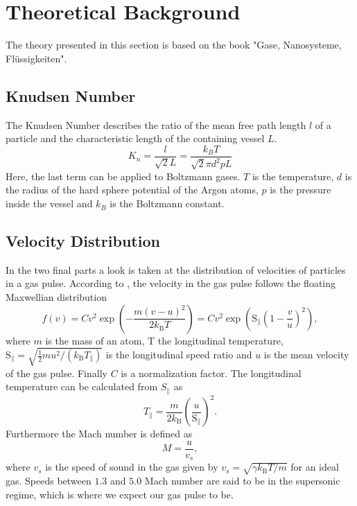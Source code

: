 \documentclass[a4paper,10pt]{article}
\begin{document}
\section{Theoretical Background}
The theory presented in this section is based on the book "Gase, Nanosysteme, Flüssigkeiten".\cite{bergmann}

\subsection{Knudsen Number}
The Knudsen Number describes the ratio of the mean free path length $l$ of a particle and the characteristic length of the containing vessel $L$.
\begin{equation}
  K_n = \frac{l}{\sqrt{2} L} = \frac{k_B T }{\sqrt{2} \pi d^2 p L}
\end{equation}
Here, the last term can be applied to Boltzmann gases. $T$ is the temperature, $d$ is the radius of the hard sphere potential of the Argon atoms, $p$ is the pressure inside the vessel and $k_B$ is the Boltzmann constant.

\subsection{Velocity Distribution}\label{theory}
In the two final parts a look is taken at the distribution of velocities of particles in a gas pulse. According to \cite{bergmann}, the velocity in the gas pulse follows the floating Maxwellian distribution 
\begin{equation}\label{floatmaxwell}
	f(v) = C v^2 \exp(- \frac{m (v - u)^2}{2 k_\mathrm{B} T}) = C v^2 \exp(\mathrm{S}_\parallel \left(1 - \frac{v}{u}\right)^2),
\end{equation}
where $m$ is the mass of an atom, T the longitudinal temperature, $\mathrm{S}_\parallel = \sqrt{\frac{1}{2} m u^2 / (k_{\mathrm{B}} T_\parallel)}$ is the longitudinal speed ratio and $u$ is the mean velocity of the gas pulse. Finally $C$ is a normalization factor. The longitudinal temperature can be calculated from $S_\parallel$  as
\begin{equation}
T_\parallel = \frac{m}{2 k_\mathrm{B}} \left(\frac{u}{\mathrm{S}_\parallel} \right)^2.
\end{equation}
Furthermore the Mach number is defined as 
\[ M = \frac{u}{v_s},\]
where $v_s$ is the speed of sound in the gas given by $v_s = \sqrt{\gamma k_\mathrm{B} T/m}$ for an ideal gas. Speeds between $1.3$ and $5.0$ Mach number are said to be in the supersonic regime, which is where we expect our gas pulse to be.
\end{document}
